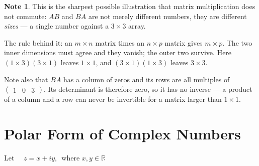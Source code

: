 \documentclass[11pt,a4paper]{article}
\theoremstyle{definition}
\newtheorem{note}[thm]{Note}
\begin{document}
\begin{note}
This is the sharpest possible illustration that matrix multiplication does not
commute: $AB$ and $BA$ are not merely different numbers, they are different
\emph{sizes} --- a single number against a $3\times 3$ array.

The rule behind it: an $m\times n$ matrix times an $n\times p$ matrix gives
$m\times p$. The two inner dimensions must agree and they vanish; the outer two
survive. Here $(1\times 3)(3\times 1)$ leaves $1\times 1$, and
$(3\times 1)(1\times 3)$ leaves $3\times 3$.

Note also that $BA$ has a column of zeros and its rows are all multiples of
$\begin{pmatrix}1&0&3\end{pmatrix}$. Its determinant is therefore zero, so it has
no inverse --- a product of a column and a row can never be invertible for a matrix
larger than $1\times 1$.
\end{note}

\pagebreak
\section{Polar Form of Complex Numbers}

\begin{figure}[H]
\centering
{}
\end{figure}











Let $\quad  z = x + i y,\,$ where $x,y\in \mathbb{R}$
\end{document}
